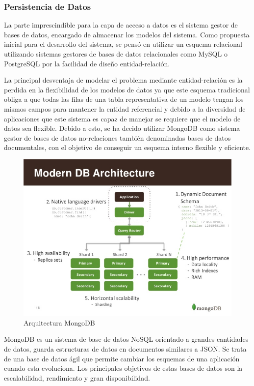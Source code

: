 \documentclass[a4paper,11pt]{book}
\begin{document}
\subsubsection{Persistencia de Datos}

La parte imprescindible para la capa de acceso a datos es el sistema gestor de bases de datos, encargado de almacenar los modelos del sistema. Como propuesta inicial para el desarrollo del sistema, se pensó en utilizar un esquema relacional utilizando sistemas gestores de bases de datos relacionales como MySQL o PostgreSQL  por la facilidad de diseño entidad-relación.

La principal desventaja de modelar el problema mediante entidad-relación es la perdida en la flexibilidad de los modelos de datos ya que este esquema tradicional obliga a que todas las filas de una tabla representativa de un modelo tengan los mismos campos para mantener la entidad referencial y debido a la diversidad de aplicaciones que este sistema es capaz de manejar se requiere que el modelo de datos sea flexible. Debido a esto, se ha decido utilizar MongoDB\cite{mg} como sistema gestor de bases de datos no-relaciones también denominadas bases de datos documentales, con el objetivo de conseguir un esquema interno flexible y eficiente.

\begin{figure}[H]
\centering
\includegraphics[scale=0.30]{imagenes/mongo.jpg}
\caption{ Arquitectura MongoDB\cite{mongoA}  }
\end{figure}

MongoDB es un sistema de base de datos NoSQL orientado a grandes cantidades de datos, guarda estructuras de datos en documentos similares a JSON. Se trata de una base de datos ágil que permite cambiar los esquemas de una aplicación cuando esta evoluciona. Los principales objetivos de estas bases de datos son la escalabilidad, rendimiento y gran disponibilidad.
\end{document}
